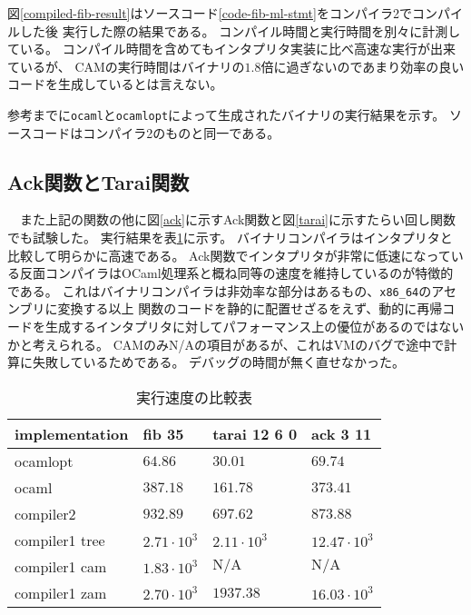 \documentclass[report]{jlreq}
\begin{document}
      図\ref{compiled-fib-result}はソースコード\ref{code-fib-ml-stmt}をコンパイラ2でコンパイルした後
      実行した際の結果である。
      コンパイル時間と実行時間を別々に計測している。
      コンパイル時間を含めてもインタプリタ実装に比べ高速な実行が出来ているが、
      CAMの実行時間はバイナリの$1.8$倍に過ぎないのであまり効率の良いコードを生成しているとは言えない。
      
      

      参考までに\texttt{ocaml}と\texttt{ocamlopt}によって生成されたバイナリの実行結果を示す。
      ソースコードはコンパイラ2のものと同一である。
      
    \subsection{Ack関数とTarai関数}
    　また上記の関数の他に図\ref{ack}に示すAck関数と図\ref{tarai}に示すたらい回し関数でも試験した。
      実行結果を表\ref{compare-tbl}に示す。
      バイナリコンパイラはインタプリタと比較して明らかに高速である。
      Ack関数でインタプリタが非常に低速になっている反面コンパイラはOCaml処理系と概ね同等の速度を維持しているのが特徴的である。
      これはバイナリコンパイラは非効率な部分はあるもの、\texttt{x86\_64}のアセンブリに変換する以上
      関数のコードを静的に配置せざるをえず、動的に再帰コードを生成するインタプリタに対してパフォーマンス上の優位があるのではないかと考えられる。
      CAMのみN/Aの項目があるが、これはVMのバグで途中で計算に失敗しているためである。
      デバッグの時間が無く直せなかった。
      
      
      \begin{table}[t]
        \centering
        \label{compare-tbl}
        \caption{実行速度の比較表}
        \begin{tabular}{l|lll}
        implementation & fib 35             & tarai 12 6 0         & ack 3 11            \\ \hline
        ocamlopt       & $64.86           $ & $ 30.01            $ & $ 69.74            $ \\
        ocaml          & $387.18          $ & $ 161.78           $ & $ 373.41           $ \\
        compiler2      & $932.89          $ & $ 697.62           $ & $ 873.88           $ \\
        compiler1 tree & $2.71 \cdot 10^3 $ & $ 2.11 \cdot 10^3  $ & $ 12.47 \cdot 10^3 $ \\
        compiler1 cam  & $1.83 \cdot 10^3 $ & $ \mathrm{N/A}     $ & $ \mathrm{N/A}     $ \\
        compiler1 zam  & $2.70 \cdot 10^3 $ & $ 1937.38          $ & $ 16.03 \cdot 10^3 $
        \end{tabular}
      \end{table}
\end{document}
